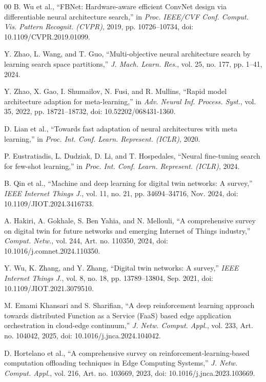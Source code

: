 \documentclass[a4paper,fleqn]{cas-sc}
\begin{document}
\begin{thebibliography}{00}
 B. Wu et al., ``FBNet: Hardware-aware efficient ConvNet design via differentiable neural architecture search,'' in \emph{Proc. IEEE/CVF Conf. Comput. Vis. Pattern Recognit. (CVPR)}, 2019, pp. 10726--10734, doi: 10.1109/CVPR.2019.01099.

 Y. Zhao, L. Wang, and T. Guo, ``Multi-objective neural architecture search by learning search space partitions,'' \emph{J. Mach. Learn. Res.}, vol. 25, no. 177, pp. 1--41, 2024.

Y. Zhao, X. Gao, I. Shumailov, N. Fusi, and R. Mullins,
``Rapid model architecture adaption for meta-learning,''
in \emph{Adv. Neural Inf. Process. Syst.},
vol. 35, 2022, pp. 18721--18732,
doi: 10.52202/068431-1360.

D. Lian et al.,
``Towards fast adaptation of neural architectures with meta learning,''
in \emph{Proc. Int. Conf. Learn. Represent. (ICLR)}, 2020.

P. Eustratiadis, L. Dudziak, D. Li, and T. Hospedales,
``Neural fine-tuning search for few-shot learning,''
in \emph{Proc. Int. Conf. Learn. Represent. (ICLR)}, 2024.

 B. Qin et al., ``Machine and deep learning for digital twin networks: A survey,'' \emph{IEEE Internet Things J.}, vol. 11, no. 21, pp. 34694--34716, Nov. 2024, doi: 10.1109/JIOT.2024.3416733.

 A. Hakiri, A. Gokhale, S. Ben Yahia, and N. Mellouli, ``A comprehensive survey on digital twin for future networks and emerging Internet of Things industry,'' \emph{Comput. Netw.}, vol. 244, Art. no. 110350, 2024, doi: 10.1016/j.comnet.2024.110350.

 Y. Wu, K. Zhang, and Y. Zhang, ``Digital twin networks: A survey,'' \emph{IEEE Internet Things J.}, vol. 8, no. 18, pp. 13789--13804, Sep. 2021, doi: 10.1109/JIOT.2021.3079510.

M. Emami Khansari and S. Sharifian,
``A deep reinforcement learning approach towards distributed Function as a
Service (FaaS) based edge application orchestration in cloud-edge
continuum,''
\emph{J. Netw. Comput. Appl.}, vol. 233,
Art. no. 104042, 2025,
doi: 10.1016/j.jnca.2024.104042.

 D. Hortelano et al.,
``A comprehensive survey on reinforcement-learning-based computation
offloading techniques in Edge Computing Systems,''
\emph{J. Netw. Comput. Appl.}, vol. 216,
Art. no. 103669, 2023, doi: 10.1016/j.jnca.2023.103669.


\end{thebibliography}
\end{document}
